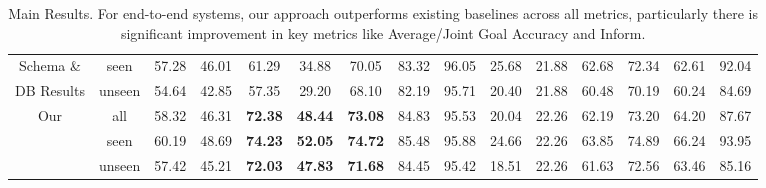 \begin{table}
\begin{adjustbox}{max width=\textwidth}
\begin{tabular}{|c|c|c|c|c|c|c|c|c|c|c|c|c|c|c|}
            {Schema \&}                & seen    & 57.28    & 46.01    & 61.29          & 34.88          & 70.05          & 83.32                     & 96.05     & 25.68                     & 21.88                     & 62.68   & 72.34      & 62.61      & 92.04    \\
            {DB Results}               & unseen  & 54.64    & 42.85    & 57.35          & 29.20          & 68.10          & 82.19                     & 95.71     & 20.40                     & 21.88                     & 60.48   & 70.19      & 60.24      & 84.69    \\ \hline
            \multirow{3}{*}{Our}       & all     & 58.32    & 46.31    & \textbf{72.38} & \textbf{48.44} & \textbf{73.08} & 84.83                     & 95.53     & 20.04                     & 22.26                     & 62.19   & 73.20      & 64.20      & 87.67    \\
                                       & seen    & 60.19    & 48.69    & \textbf{74.23} & \textbf{52.05} & \textbf{74.72} & 85.48                     & 95.88     & 24.66                     & 22.26                     & 63.85   & 74.89      & 66.24      & 93.95    \\
                                       & unseen  & 57.42    & 45.21    & \textbf{72.03} & \textbf{47.83} & \textbf{71.68} & 84.45                     & 95.42     & 18.51                     & 22.26                     & 61.63   & 72.56      & 63.46      & 85.16    \\ \hline
        \end{tabular}
    \end{adjustbox}
    \caption{Main Results. For end-to-end systems, our approach outperforms existing baselines across all metrics, particularly there is significant improvement in key metrics like Average/Joint Goal Accuracy and Inform.}
    \label{tab:main-results}
\end{table}

